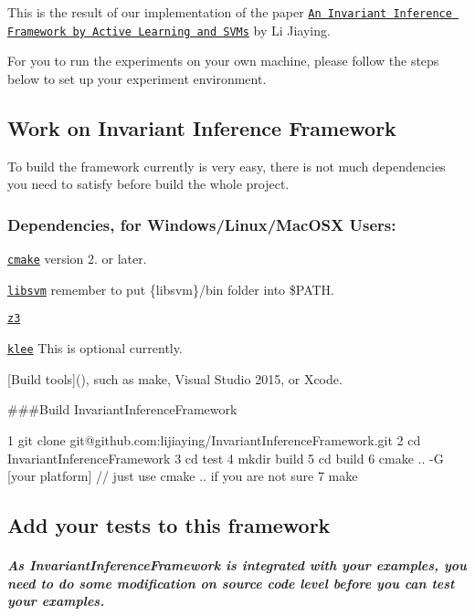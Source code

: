 This is the result of our implementation of the paper \href{../../Papers/AInvariantInferenceFrameworkbyActiveLearningandSVMs.pdf}{\tt An Invariant Inference Framework by Active Learning and S\+V\+Ms} by Li Jiaying.

For you to run the experiments on your own machine, please follow the steps below to set up your experiment environment.

\subsection*{Work on Invariant Inference Framework}

To build the framework currently is very easy, there is not much dependencies you need to satisfy before build the whole project.

\subsubsection*{Dependencies, for Windows/\+Linux/\+Mac\+O\+SX Users\+:}


\begin{DoxyItemize}
\item \href{https://cmake.org/}{\tt cmake} version 2. or later.
\item \href{https://www.csie.ntu.edu.tw/~cjlin/libsvm/}{\tt libsvm} remember to put \{libsvm\}/bin folder into \$\+P\+A\+TH.
\item \href{https://github.com/Z3Prover/z3}{\tt z3}
\item \href{https://klee.github.io/}{\tt klee} This is optional currently.
\item \mbox{[}Build tools\mbox{]}(), such as make, Visual Studio 2015, or Xcode.
\end{DoxyItemize}

\#\#\#\+Build Invariant\+Inference\+Framework 
\begin{DoxyCode}
1 git clone git@github.com:lijiaying/InvariantInferenceFramework.git
2 cd InvariantInferenceFramework
3 cd test
4 mkdir build
5 cd build
6 cmake .. -G [your platform]  // just use cmake .. if you are not sure
7 make
\end{DoxyCode}


\subsection*{Add your tests to this framework}

\subparagraph*{As Invariant\+Inference\+Framework is integrated with your examples, you need to do some modification on source code level before you can test your examples.}


